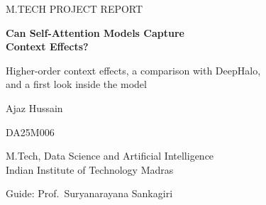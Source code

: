 \documentclass[11pt,a4paper]{article}
\numberwithin{table}{section}
\numberwithin{figure}{section}
\numberwithin{equation}{section}
\begin{document}
\begin{titlepage}
\centering
\vspace*{1.2cm}
{\large M.TECH PROJECT REPORT\par}
\vspace{1.4cm}
{\LARGE\bfseries Can Self-Attention Models Capture\\[4pt] Context Effects?\par}
\vspace{0.4cm}
{\large Higher-order context effects, a comparison with DeepHalo,\\ and a first look inside the model\par}
\vspace{1.2cm}
{\large Ajaz Hussain\par}
DA25M006\par
\vspace{0.8cm}
M.Tech, Data Science and Artificial Intelligence\\
Indian Institute of Technology Madras\par
\vspace{0.6cm}
Guide: Prof.\ Suryanarayana Sankagiri\par
\vspace{1.2cm}
\begin{minipage}{0.92\textwidth}
\small\setlength{\parskip}{4pt}

\end{minipage}
\end{titlepage}
\end{document}
